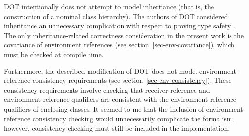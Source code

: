 DOT intentionally does not attempt to model inheritance
(that is, the construction of a nominal class hierarchy).
The authors of DOT considered inheritance an unnecessary complication
with respect to proving type safety~\cite{dot}.
The only inheritance-related correctness consideration in the present work
is the covariance of environment references (see section~\ref{sec-env-covariance}),
which must be checked at compile time.

Furthermore, the described modification of DOT does not model environment-reference
consistency requirements (see section~\ref{sec-env-consistency}).
These consistency requirements involve checking that receiver-reference
and environment-reference qualifiers are consistent with the environment
reference qualifiers of enclosing classes.
It seemed to me that the inclusion of environment-reference consistency checking
would unnecessarily complicate the formalism;
however, consistency checking must still be included in the implementation.